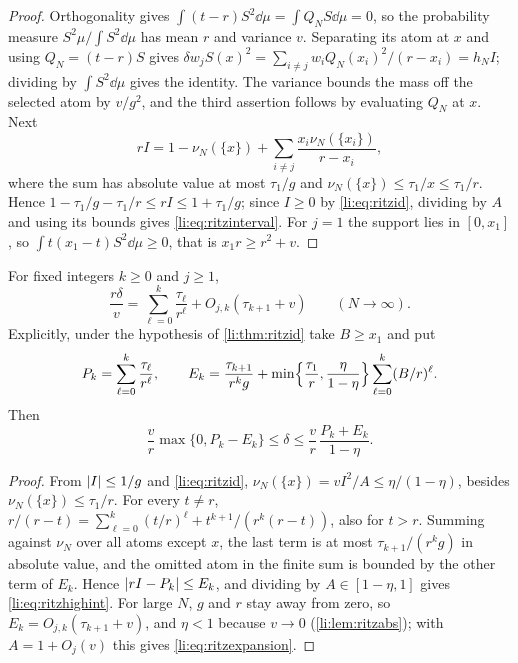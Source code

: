 \begin{proof}
Orthogonality gives $\int(t-r)S^2\dd\mu=\int Q_NS\dd\mu=0$, so the probability measure
$S^2\mu/\int S^2\dd\mu$ has mean $r$ and variance $v$. Separating its atom at $x$ and using
$Q_N=(t-r)S$ gives $\delta w_jS(x)^2=\sum_{i\ne j}w_iQ_N(x_i)^2/(r-x_i)=h_NI$; dividing by
$\int S^2\dd\mu$ gives the identity. The variance bounds the mass off the selected atom by $v/g^2$, and
the third assertion follows by evaluating $Q_N$ at $x$. Next
\[
 rI=1-\nu_N(\{x\})+\sum_{i\ne j}\frac{x_i\nu_N(\{x_i\})}{r-x_i},
\]
where the sum has absolute value at most $\tau_1/g$ and $\nu_N(\{x\})\le\tau_1/x\le\tau_1/r$. Hence
$1-\tau_1/g-\tau_1/r\le rI\le1+\tau_1/g$; since $I\ge0$ by \eqref{li:eq:ritzid}, dividing by $A$ and
using its bounds gives \eqref{li:eq:ritzinterval}. For $j=1$ the support lies in $[0,x_1]$, so
$\int t(x_1-t)S^2\dd\mu\ge0$, that is $x_1r\ge r^2+v$.
\end{proof}

\begin{theorem}\label{li:thm:ritzhigh}
For fixed integers $k\ge0$ and $j\ge1$,
\begin{equation}\label{li:eq:ritzexpansion}
 \frac{r\delta}v=\sum_{\ell=0}^k\frac{\tau_\ell}{r^\ell}+O_{j,k}(\tau_{k+1}+v)\qquad(N\to\infty).
\end{equation}
Explicitly, under the hypothesis of \cref{li:thm:ritzid} take $B\ge x_1$ and put
\[
 P_k=\sum_{\ell=0}^k\frac{\tau_\ell}{r^\ell},\qquad
 E_k=\frac{\tau_{k+1}}{r^kg}+\min\Bigl\{\frac{\tau_1}r,\frac\eta{1-\eta}\Bigr\}\sum_{\ell=0}^k(B/r)^\ell .
\]
Then
\begin{equation}\label{li:eq:ritzhighint}
 \frac vr\max\{0,P_k-E_k\}\le\delta\le\frac vr\,\frac{P_k+E_k}{1-\eta}.
\end{equation}
\end{theorem}

\begin{proof}
From $\lvert I\rvert\le1/g$ and \eqref{li:eq:ritzid}, $\nu_N(\{x\})=vI^2/A\le\eta/(1-\eta)$, besides
$\nu_N(\{x\})\le\tau_1/r$. For every $t\ne r$,
$r/(r-t)=\sum_{\ell=0}^k(t/r)^\ell+t^{k+1}/(r^k(r-t))$, also for $t>r$. Summing against $\nu_N$ over all
atoms except $x$, the last term is at most $\tau_{k+1}/(r^kg)$ in absolute value, and the omitted atom
in the finite sum is bounded by the other term of $E_k$. Hence $\lvert rI-P_k\rvert\le E_k$, and dividing by
$A\in[1-\eta,1]$ gives \eqref{li:eq:ritzhighint}. For large $N$, $g$ and $r$ stay away from zero, so
$E_k=O_{j,k}(\tau_{k+1}+v)$, and $\eta<1$ because $v\to0$ (\cref{li:lem:ritzabs}); with
$A=1+O_j(v)$ this gives \eqref{li:eq:ritzexpansion}.
\end{proof}

